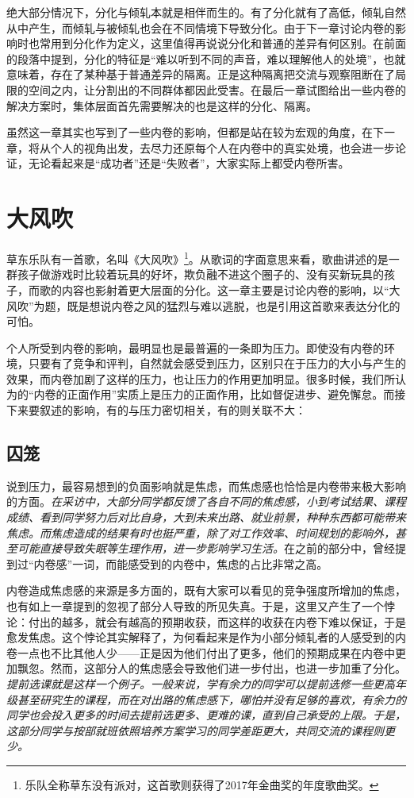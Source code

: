 \documentclass[UTF8,a4paper,fontset=windows,11pt,openany]{ctexbook}
\begin{document}
绝大部分情况下，分化与倾轧本就是相伴而生的。有了分化就有了高低，倾轧自然从中产生，而倾轧与被倾轧也会在不同情境下导致分化。由于下一章讨论内卷的影响时也常用到分化作为定义，这里值得再说说分化和普通的差异有何区别。在前面的段落中提到，分化的特征是“难以听到不同的声音，难以理解他人的处境”，也就意味着，存在了某种基于普通差异的隔离。正是这种隔离把交流与观察阻断在了局限的空间之内，让分割出的不同群体都因此受害。在最后一章试图给出一些内卷的解决方案时，集体层面首先需要解决的也是这样的分化、隔离。

虽然这一章其实也写到了一些内卷的影响，但都是站在较为宏观的角度，在下一章，将从个人的视角出发，去尽力还原每个人在内卷中的真实处境，也会进一步论证，无论看起来是“成功者”还是“失败者”，大家实际上都受内卷所害。

\chapter{大风吹}

草东乐队有一首歌，名叫《大风吹》\footnote{乐队全称草东没有派对，这首歌则获得了2017年金曲奖的年度歌曲奖。}。从歌词的字面意思来看，歌曲讲述的是一群孩子做游戏时比较着玩具的好坏，欺负融不进这个圈子的、没有买新玩具的孩子，而歌的内容也影射着更大层面的分化。这一章主要是讨论内卷的影响，以“大风吹”为题，既是想说内卷之风的猛烈与难以逃脱，也是引用这首歌来表达分化的可怕。

个人所受到内卷的影响，最明显也是最普遍的一条即为压力。即使没有内卷的环境，只要有了竞争和评判，自然就会感受到压力，区别只在于压力的大小与产生的效果，而内卷加剧了这样的压力，也让压力的作用更加明显。很多时候，我们所认为的“内卷的正面作用”实质上是压力的正面作用，比如督促进步、避免懈怠。而接下来要叙述的影响，有的与压力密切相关，有的则关联不大：

\section{囚笼}

说到压力，最容易想到的负面影响就是焦虑，而焦虑感也恰恰是内卷带来极大影响的方面。\emph{在采访中，大部分同学都反馈了各自不同的焦虑感，小到考试结果、课程成绩、看到同学努力后对比自身，大到未来出路、就业前景，种种东西都可能带来焦虑。而焦虑造成的结果有时也挺严重，除了对工作效率、时间规划的影响外，甚至可能直接导致失眠等生理作用，进一步影响学习生活。}在之前的部分中，曾经提到过“内卷感”一词，而能感受到的内卷中，焦虑的占比非常之高。

内卷造成焦虑感的来源是多方面的，既有大家可以看见的竞争强度所增加的焦虑，也有如上一章提到的忽视了部分人导致的所见失真。于是，这里又产生了一个悖论：付出的越多，就会有越高的预期收获，而这样的收获在内卷下难以保证，于是愈发焦虑。这个悖论其实解释了，为何看起来是作为小部分倾轧者的人感受到的内卷一点也不比其他人少——正是因为他们付出了更多，他们的预期成果在内卷中更加飘忽。然而，这部分人的焦虑感会导致他们进一步付出，也进一步加重了分化。\emph{提前选课就是这样一个例子。一般来说，学有余力的同学可以提前选修一些更高年级甚至研究生的课程，而在对出路的焦虑感下，哪怕并没有足够的喜欢，有余力的同学也会投入更多的时间去提前选更多、更难的课，直到自己承受的上限。于是，这部分同学与按部就班依照培养方案学习的同学差距更大，共同交流的课程则更少。}
\end{document}
